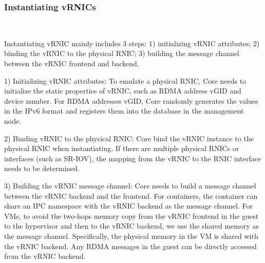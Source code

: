 \subsubsection{\textbf{Instantiating vRNICs}}
\
\noindent


Instantiating vRNIC mainly includes 3 steps: 1) initializing vRNIC attributes; 2) binding the vRNIC to the physical RNIC; 3) building the message channel between the vRNIC frontend and backend.


1) Initializing vRNIC attributes: To emulate a physical RNIC, \sys Core needs to initialize the static properties of vRNIC, such as RDMA address vGID and device number. For RDMA addresses vGID, \sys Core randomly generates the values in the IPv6 format and registers them into the database in the management node.


2) Binding vRNIC to the physical RNIC: \sys Core bind the vRNIC instance to the physical RNIC when instantiating. If there are multiple physical RNICs or interfaces (such as SR-IOV), the mapping from the vRNIC to the RNIC interface needs to be determined.


3) Building the vRNIC message channel: \sys Core needs to build a message channel between the vRNIC backend and the frontend.
For containers, the container can share an IPC namespace with the vRNIC backend as the message channel.
For VMs, to avoid the two-hops memory copy from the vRNIC frontend in the guest to the hypervisor and then to the vRNIC backend, we use the shared memory as the message channel. Specifically, the physical memory in the VM is shared with the vRNIC backend. Any RDMA messages in the guest can be directly accessed from the vRNIC backend.

